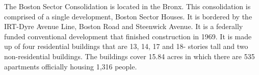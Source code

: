      

   

The Boston Sector Consolidation is located in the Bronx. This consolidation is comprised of a single development, Boston Sector Houses. It is bordered by the IRT-Dyre Avenue Line, Boston Road and Steenwick Avenue. It is a federally funded conventional development that finished construction in 1969. It is made up of four residential buildings that are 13, 14, 17 and 18- stories tall and two non-residential buildings. The buildings cover 15.84 acres in which there are 535 apartments officially housing 1,316 people. 